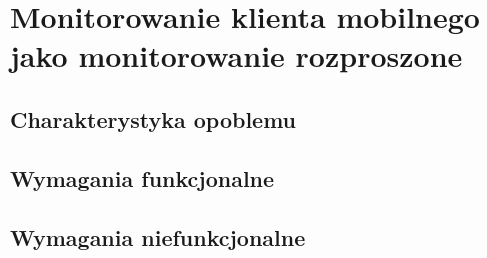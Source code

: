 \chapter{Monitorowanie klienta mobilnego jako monitorowanie rozproszone}
\label{chap:Wymagania}
\section[Charakterystyka problemu][Charakterystyka problemu]{Charakterystyka opoblemu}

\section[Wymagania funkcjonalne][Wymagania funkcjonalne]{Wymagania funkcjonalne}

\section[Wymagania niefunkcjonalne][Wymagania niefunkcjonalne]{Wymagania niefunkcjonalne}
